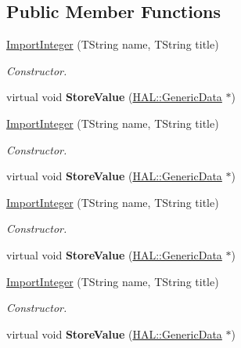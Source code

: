 \subsection*{Public Member Functions}
\begin{DoxyCompactItemize}
\item 
\hyperlink{class_h_a_l_1_1_algorithms_1_1_import_integer_a9dbe511f3ff1a3bf1d9a0de66f08da34}{Import\+Integer} (T\+String name, T\+String title)
\begin{DoxyCompactList}\small\item\em Constructor. \end{DoxyCompactList}\item 
\hypertarget{class_h_a_l_1_1_algorithms_1_1_import_integer_a182865e798de3856a85e4339155b8a7f}{virtual void {\bfseries Store\+Value} (\hyperlink{class_h_a_l_1_1_generic_data}{H\+A\+L\+::\+Generic\+Data} $\ast$)}\label{class_h_a_l_1_1_algorithms_1_1_import_integer_a182865e798de3856a85e4339155b8a7f}

\item 
\hyperlink{class_h_a_l_1_1_algorithms_1_1_import_integer_a9dbe511f3ff1a3bf1d9a0de66f08da34}{Import\+Integer} (T\+String name, T\+String title)
\begin{DoxyCompactList}\small\item\em Constructor. \end{DoxyCompactList}\item 
\hypertarget{class_h_a_l_1_1_algorithms_1_1_import_integer_a182865e798de3856a85e4339155b8a7f}{virtual void {\bfseries Store\+Value} (\hyperlink{class_h_a_l_1_1_generic_data}{H\+A\+L\+::\+Generic\+Data} $\ast$)}\label{class_h_a_l_1_1_algorithms_1_1_import_integer_a182865e798de3856a85e4339155b8a7f}

\item 
\hyperlink{class_h_a_l_1_1_algorithms_1_1_import_integer_a9dbe511f3ff1a3bf1d9a0de66f08da34}{Import\+Integer} (T\+String name, T\+String title)
\begin{DoxyCompactList}\small\item\em Constructor. \end{DoxyCompactList}\item 
\hypertarget{class_h_a_l_1_1_algorithms_1_1_import_integer_a182865e798de3856a85e4339155b8a7f}{virtual void {\bfseries Store\+Value} (\hyperlink{class_h_a_l_1_1_generic_data}{H\+A\+L\+::\+Generic\+Data} $\ast$)}\label{class_h_a_l_1_1_algorithms_1_1_import_integer_a182865e798de3856a85e4339155b8a7f}

\item 
\hyperlink{class_h_a_l_1_1_algorithms_1_1_import_integer_a9dbe511f3ff1a3bf1d9a0de66f08da34}{Import\+Integer} (T\+String name, T\+String title)
\begin{DoxyCompactList}\small\item\em Constructor. \end{DoxyCompactList}\item 
\hypertarget{class_h_a_l_1_1_algorithms_1_1_import_integer_a182865e798de3856a85e4339155b8a7f}{virtual void {\bfseries Store\+Value} (\hyperlink{class_h_a_l_1_1_generic_data}{H\+A\+L\+::\+Generic\+Data} $\ast$)}\label{class_h_a_l_1_1_algorithms_1_1_import_integer_a182865e798de3856a85e4339155b8a7f}


\end{DoxyCompactItemize}
